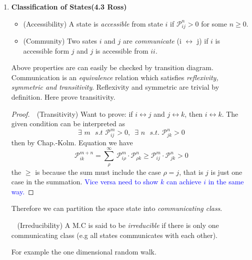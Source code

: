 \documentclass[10.5pt]{article}
\newcommand{\prob}[0]{\mathcal{P}}
\newcommand{\hilight}[1]{\colorbox{orange!20}{#1}}
\newenvironment{changemargin}[2]{%
  \begin{list}{}{%
    \setlength{\topsep}{0pt}%
    \setlength{\leftmargin}{#1}%
    \setlength{\rightmargin}{#2}%
    \setlength{\listparindent}{\parindent}%
    \setlength{\itemindent}{\parindent}%
    \setlength{\parsep}{\parskip}%
  }%
  \item[]}{\end{list}}
\begin{document}
\begin{changemargin}{-0.125in}{0in}
\begin{enumerate}
\begin{enumerate}
       \item \textbf{Classification of States(4.3 Ross)}
       
       \smallskip
       
       
       \begin{itemize}
       	\item (Accessibility) A state is \textit{accessible} from state $i$ if $\mathcal{P}_{ij}^n > 0$ for some $n \geq 0$.
        \item (Community) Two sates $i$ and $j$ are \textit{communicate} (i $\leftrightarrow$ j) if $i$ is accessible form $j$ and $j$ is accessible from $ii$. 
       \end{itemize}
       
       Above properties are can easily be checked by transition diagram. Communication is an \hilight{\textit{equivalence}} relation which satisfies \textit{reflexivity, symmetric and transitivity}. Reflexivity and symmetric are trivial by definition. Here prove transitivity. 
       
       \begin{proof}\,\, (Transitivity) Want to prove: if $i \leftrightarrow j$ and $j \leftrightarrow k$, then $i \leftrightarrow k$. The given condition can be interpreted as 
       \[
       \exists \,\, m \,\,\,\,s.t \,\, \prob_{ij}^m > 0,\,\,\, \exists\,\, n \,\,\,\,s.t. \,\, \prob_{jk}^n > 0
       \]
       	then by Chap.-Kolm. Equation we have 
       	\[
       	\prob_{ik}^{m + n} = \sum^\infty_{\rho}\,\prob_{i\rho}^m \cdot \prob_{\rho k}^n \geq \prob_{ij}^m\cdot \prob_{jk}^n > 0
       	\]
       	the $\geq$ is because the sum must include the case $\rho = j$, that is $j$ is just one case in the summation. \textcolor{blue}{Vice versa need to show $k$ can achieve $i$ in the same way.} 
       \end{proof}
       Therefore we can \hilight{partition} the space state into \textit{communicating class}. 
       
       \medskip
       
       \begin{definition} \,\,\,\,\,(Irreducibility) A M.C is said to be \textit{irreducible} if there is only one communicating class (e.g all states communicates with each other).
       \end{definition}
       
       For example the one dimensional random walk. 
        
       \medskip
       
       \medskip
       

\end{enumerate}
\end{enumerate}
\end{changemargin}
\end{document}
